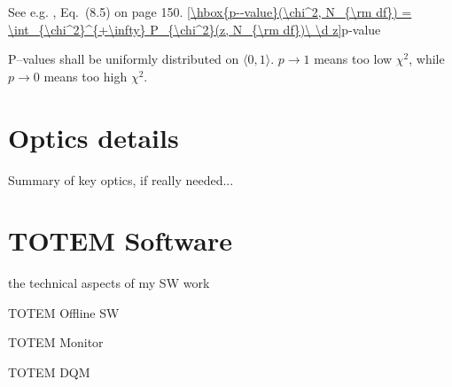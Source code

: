 See e.g. , Eq.~(8.5) on page 150.
\eqref{\hbox{p--value}(\chi^2, N_{\rm df}) = \int_{\chi^2}^{+\infty} P_{\chi^2}(z, N_{\rm df})\ \d z}{p-value}

P--values shall be uniformly distributed on $\langle 0, 1\rangle$. $p\to 1$ means too low $\chi^2$, while $p\to 0$ means too high $\chi^2$.


\chapter{Optics details}

Summary of key optics, if really needed...

\chapter{TOTEM Software}

\> the technical aspects of my SW work

\> TOTEM Offline SW


\> TOTEM Monitor

\> TOTEM DQM
